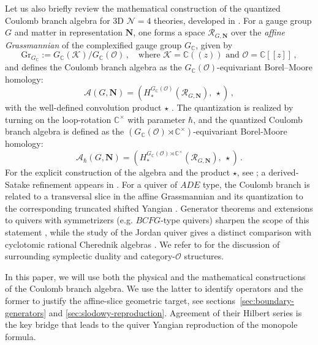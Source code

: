 \documentclass[12pt,a4paper]{article}
\begin{document}
Let us also briefly review the mathematical construction of the quantized Coulomb branch algebra for 3D $\mathcal{N}=4$ theories, developed in \cite{Nakajima2016, BFN2018, BFN2019}.
 For a gauge group $G$ and matter in representation $\mathbf N$, one forms a
space $\mathcal R_{G,\mathbf N}$ over the \textit{affine Grassmannian} of the complexified gauge group $G_{\mathbb C}$, given by
\begin{equation}
    \text{Gr}_{G_{\mathbb C}}:=G_{\mathbb C}(\mathcal K)/G_{\mathbb C}(\mathcal O)\,,\quad \text{where } \mathcal{K}=\mathbb C((z)) \text{ and } \mathcal{O}=\mathbb C[[z]]\,,
\end{equation}
and defines the
Coulomb branch algebra as the $G_{\mathbb C}(\mathcal O)$-equivariant Borel–Moore homology:
\begin{equation}
     \mathcal A(G,\mathbf N)
 =\left(H_*^{G_{\mathbb C}(\mathcal O)}
   (\mathcal R_{G,\mathbf N}),\ \star\right)\,,
\end{equation}
with the well-defined convolution product $\star$ \cite{BFN2018}. The quantization is realized by turning on the loop-rotation $\mathbb C^\times$ with parameter $\hbar$, and the 
quantized Coulomb branch algebra is defined as the $(G_{\mathbb C}(\mathcal O)\rtimes\mathbb C^\times)$-equivariant Borel-Moore homology:
\begin{equation}
 \mathcal A_\hbar(G,\mathbf N)
 =\left(H_*^{G_{\mathbb C}(\mathcal O) \rtimes\mathbb C^\times}
   (\mathcal R_{G,\mathbf N}), \ \star\right)\,.
 \label{eq:bfn-algebra}
\end{equation}
For the explicit construction of the algebra and the product $\star$, see \cite{Nakajima2016,BFN2018}; a derived-Satake
refinement appears in \cite{BFNDerived2019}.  For a quiver of $ADE$ type, the
Coulomb branch is related to a transversal slice in the affine Grassmannian and
its quantization to the corresponding truncated shifted Yangian \cite{BFN2019,KWWY2012}.
Generator theorems and extensions to quivers with symmetrizers (e.g. $BCFG$-type quivers) sharpen the
scope of this statement \cite{Weekes2019,NakajimaWeekes2021}, while the study of the Jordan
quiver gives a distinct comparison with cyclotomic rational Cherednik algebras
\cite{KoderaNakajima2018}.  We refer to \cite{Kamnitzer2022,braden2022,KamnitzerEtAl2018} for the discussion of surrounding
symplectic duality and category-$\mathcal O$ structures.


In this paper, we will use both the physical and the mathematical constructions of the Coulomb branch algebra.
We use the latter to identify operators and the former to justify
the affine-slice geometric target, see sections~\ref{sec:boundary-generators} and \ref{sec:slodowy-reproduction}.  Agreement of their Hilbert series \cite{Nakajima2016} is the key bridge that leads to the quiver Yangian reproduction of the monopole formula.
\end{document}

